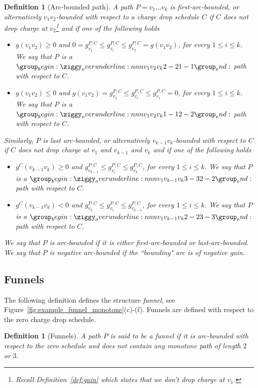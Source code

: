 \documentclass[11pt]{article}
\newtheorem{definition}[theorem]{Definition}
\begin{document}
\begin{definition}[Arc-bounded path]\label{def:arc-bounded}
    A path $P=v_1\ldots  v_k$ is first-arc-bounded, or 
    alternatively $v_1 v_2$-bounded with respect to a charge drop schedule $C$ if $C$ does not drop charge at  $v_2$\footnote{Recall Definition~\ref{def:gain} which states that we don't drop charge at $v_1$.} and if one of the following holds
    \begin{itemize}
        \item $g(v_1 v_2) \ge 0 $ and $0 = g^{P,C}_{v_1} \le g^{P,C}_{v_i} \le g^{P,C}_{v_2} = g(v_1 v_2)$, for every $1\le i\le k$.  We say that $P$ is a $ \overunderline{{v_1}{v_2}{v_k}}{2-2}{1-1}$ path with respect to $C$.
        \item  $g(v_1 v_2 )\le 0$ and $g(v_1 v_2)=g^{P,C}_{v_2} \le g^{P,C}_{v_i} \le g^{P,C}_{v_1} = 0$, for every $1\le i\le k$. We say that $P$ is a $\overunderline{{v_1}{v_2}{v_k}}{1-1}{2-2}$ path with respect to $C$.
    \end{itemize}
    Similarly, $P$ is last arc-bounded, or alternatively $v_{k-1} v_k$-bounded with respect to $C$ if $C$ does not drop charge at $v_1$ and  $v_{k-1}$ and $v_k$ and if one of the following holds
    \begin{itemize}
        \item $g^{C}(v_{k-1} v_k) \ge 0 $ and $g^{P,C}_{v_{k-1}} \le g^{P,C}_{v_i} \le g^{P,C}_{v_k}$, for every $1\le i\le k$.  We say that $P$ is a $\overunderline{{v_1}{v_{k-1}}{v_k}}{3-3}{2-2}$ path with respect to $C$.
        \item  $g^C(v_{k-1} v_k )<0$ and $g^{P,C}_{v_k} \le g^{P,C}_{v_i} \le g^{P,C}_{v_{k-1}}$, for every $1\le i\le k$. We say that $P$ is a $\overunderline{{v_1}{v_{k-1}}{v_k}}{2-2}{3-3}$ path with respect to $C$.
    \end{itemize}
     We say that $P$ is arc-bounded if it is either first-arc-bounded or last-arc-bounded. We say that $P$ is negative arc-bounded if the ``bounding" arc is of negative gain.
\end{definition}

\subsection{Funnels}

The following definition defines the structure \emph{funnel}, see Figure~\ref{fig:example_funnel_monotone}(c)-(f). Funnels are defined with respect to the zero charge drop schedule. 

\begin{definition}[Funnels]\label{def:funnel}
    A path $P$ is said to be a \emph{funnel} if it is arc-bounded with respect to the zero schedule 
    and does not contain any monotone path of length $2$ or $3$.
\end{definition}
\end{document}
